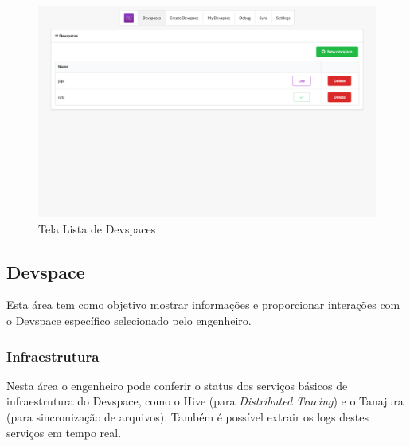     \begin{figure}[htb]
    	\caption{\label{fig_frontend_devspaces}Tela Lista de Devspaces}
    	\begin{center}
    	\includegraphics[width=\textwidth,keepaspectratio]{pictures/frontend/frontend-devspaces.png}
    	\end{center}
    \end{figure}



    \subsection{Devspace}
    Esta área tem como objetivo mostrar informações e proporcionar interações com o Devspace específico selecionado pelo engenheiro.

    \subsubsection{Infraestrutura}
    Nesta área o engenheiro pode conferir o status dos serviços básicos de infraestrutura do Devspace, como o Hive (para \textit{Distributed Tracing}) e o Tanajura (para sincronização de arquivos). Também é possível extrair os logs destes serviços em tempo real.

